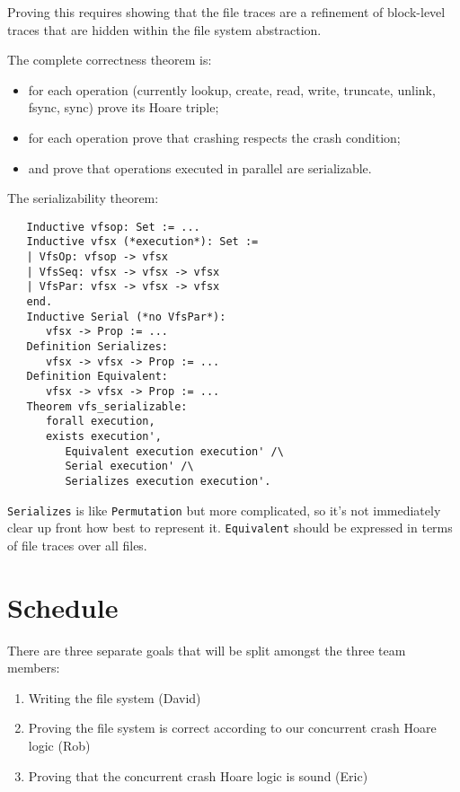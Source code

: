\documentclass[11pt, twocolumn, letterpaper]{article}
\newcommand{\coqsize}{\scriptsize}
\begin{document}
Proving this requires showing that the file traces are a refinement of
block-level traces that are hidden within the file system abstraction.

The complete correctness theorem is:
\begin{itemize}
\item for each operation (currently lookup, create, read, write,
truncate, unlink, fsync, sync) prove its Hoare triple;
\item for each operation prove that crashing respects the crash
condition;
\item and prove that operations executed in parallel are serializable.
\end{itemize}

The serializability theorem:
{\coqsize
\begin{verbatim}
   Inductive vfsop: Set := ...
   Inductive vfsx (*execution*): Set :=
   | VfsOp: vfsop -> vfsx
   | VfsSeq: vfsx -> vfsx -> vfsx
   | VfsPar: vfsx -> vfsx -> vfsx
   end.
   Inductive Serial (*no VfsPar*):
      vfsx -> Prop := ...
   Definition Serializes:
      vfsx -> vfsx -> Prop := ...
   Definition Equivalent:
      vfsx -> vfsx -> Prop := ...
   Theorem vfs_serializable:
      forall execution,
      exists execution',
         Equivalent execution execution' /\
         Serial execution' /\
         Serializes execution execution'.
\end{verbatim}
}

\texttt{Serializes} is like \texttt{Permutation} but more complicated,
so it's not immediately clear up front how best to represent it.
\texttt{Equivalent} should be expressed in terms of file traces over
all files.

\section{Schedule}

%

There are three separate goals that will be split amongst the three team
members:

\begin{enumerate}
    \item Writing the file system (David)

    \item Proving the file system is correct according to our
concurrent crash Hoare logic (Rob)

    \item Proving that the concurrent crash Hoare logic is sound (Eric)
\end{enumerate}
\end{document}
